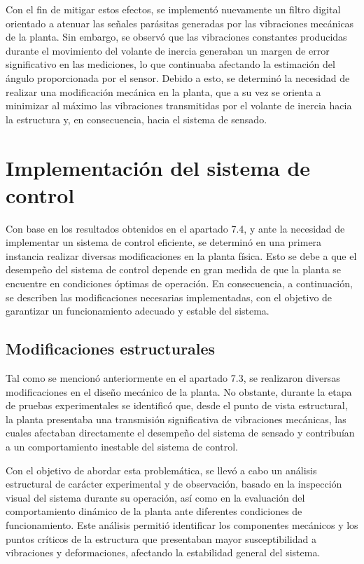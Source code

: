 \documentclass[12pt,letterpaper]{report}
\begin{document}
Con el fin de mitigar estos efectos, se implementó nuevamente un filtro digital orientado a atenuar las señales parásitas generadas por las vibraciones mecánicas de la planta. Sin embargo, se observó que las vibraciones constantes producidas durante el movimiento del volante de inercia generaban un margen de error significativo en las mediciones, lo que continuaba afectando la estimación del ángulo proporcionada por el sensor. Debido a esto, se determinó la necesidad de realizar una modificación mecánica en la planta, que a su vez se orienta a minimizar al máximo las vibraciones transmitidas por el volante de inercia hacia la estructura y, en consecuencia, hacia el sistema de sensado.

\section{Implementación del sistema de control}

Con base en los resultados obtenidos en el apartado 7.4, y ante la necesidad de implementar un sistema de control eficiente, se determinó en una primera instancia realizar diversas modificaciones en la planta física. Esto se debe a que el desempeño del sistema de control depende en gran medida de que la planta se encuentre en condiciones óptimas de operación. En consecuencia, a continuación, se describen las modificaciones necesarias implementadas, con el objetivo de garantizar un funcionamiento adecuado y estable del sistema.

\subsection*{Modificaciones estructurales}

Tal como se mencionó anteriormente en el apartado 7.3, se realizaron diversas modificaciones en el diseño mecánico de la planta. No obstante, durante la etapa de pruebas experimentales se identificó que, desde el punto de vista estructural, la planta presentaba una transmisión significativa de vibraciones mecánicas, las cuales afectaban directamente el desempeño del sistema de sensado y contribuían a un comportamiento inestable del sistema de control.

Con el objetivo de abordar esta problemática, se llevó a cabo un análisis estructural de carácter experimental y de observación, basado en la inspección visual del sistema durante su operación, así como en la evaluación del comportamiento dinámico de la planta ante diferentes condiciones de funcionamiento. Este análisis permitió identificar los componentes mecánicos y los puntos críticos de la estructura que presentaban mayor susceptibilidad a vibraciones y deformaciones, afectando la estabilidad general del sistema.
\end{document}
